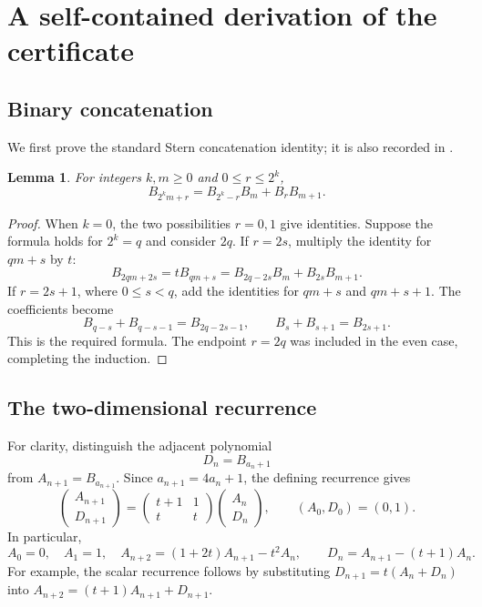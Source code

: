 \documentclass[11pt]{article}
\numberwithin{equation}{section}
\newtheorem{lemma}[theorem]{Lemma}
\theoremstyle{definition}
\begin{document}
\section{A self-contained derivation of the certificate}\label{sec:certificate}

\subsection{Binary concatenation}

We first prove the standard Stern concatenation identity; it is also
recorded in \cite[Lemma 2.1]{Ulas}.

\begin{lemma}\label{lem:concat}
For integers $k,m\geq0$ and $0\leq r\leq 2^k$,
\begin{equation}\label{eq:concat}
 B_{2^k m+r}=B_{2^k-r}B_m+B_rB_{m+1}.
\end{equation}
\end{lemma}
\begin{proof}
When $k=0$, the two possibilities $r=0,1$ give identities.
Suppose the formula holds for $2^k=q$ and consider $2q$.
If $r=2s$, multiply the identity for $qm+s$ by $t$:
\[
 B_{2qm+2s}=tB_{qm+s}
 =B_{2q-2s}B_m+B_{2s}B_{m+1}.
\]
If $r=2s+1$, where $0\leq s<q$, add the identities for
$qm+s$ and $qm+s+1$.  The coefficients become
\[
 B_{q-s}+B_{q-s-1}=B_{2q-2s-1},\qquad
 B_s+B_{s+1}=B_{2s+1}.
\]
This is the required formula.  The endpoint $r=2q$ was included in the
even case, completing the induction.
\end{proof}

\subsection{The two-dimensional recurrence}

For clarity, distinguish the adjacent polynomial
\[
 D_n=B_{a_n+1}
\]
from $A_{n+1}=B_{a_{n+1}}$.  Since $a_{n+1}=4a_n+1$, the defining
recurrence gives
\begin{equation}\label{eq:adjacent}
 \begin{pmatrix}A_{n+1}\\D_{n+1}\end{pmatrix}
 =\begin{pmatrix}t+1&1\\t&t\end{pmatrix}
   \begin{pmatrix}A_n\\D_n\end{pmatrix},
 \qquad (A_0,D_0)=(0,1).
\end{equation}
In particular,
\begin{equation}\label{eq:Arecurrence}
 A_0=0,\quad A_1=1,\quad
 A_{n+2}=(1+2t)A_{n+1}-t^2A_n,
 \qquad D_n=A_{n+1}-(t+1)A_n.
\end{equation}
For example, the scalar recurrence follows by substituting
$D_{n+1}=t(A_n+D_n)$ into $A_{n+2}=(t+1)A_{n+1}+D_{n+1}$.
\end{document}
